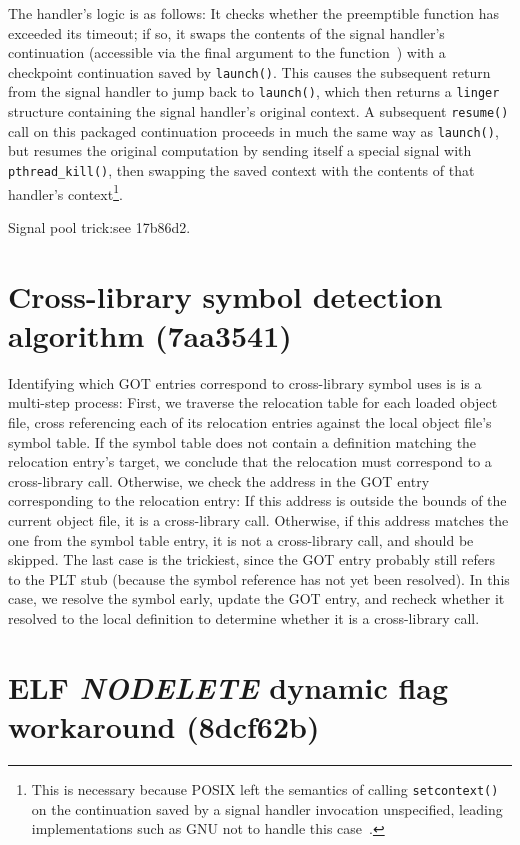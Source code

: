 \documentclass[12pt,letterpaper,openright]{report}
\begin{document}
The handler's logic is as follows:  It checks whether
the preemptible function has exceeded its timeout; if so, it swaps the contents
of the signal handler's continuation (accessible via the final argument to the
function~\cite{sigaction-manpage}) with a checkpoint continuation saved by
\texttt{launch()}.  This causes the subsequent return from the signal handler
to jump back to \texttt{launch()}, which then returns a \texttt{linger}
structure containing the signal handler's original context.  A subsequent
\texttt{resume()} call on this packaged continuation proceeds in much the same
way as \texttt{launch()}, but resumes the original computation by sending
itself a special signal with \texttt{pthread\_kill()}, then swapping the saved
context with the contents of that handler's context\footnote{This is necessary
because POSIX left the semantics of calling \texttt{setcontext()} on the
continuation saved by a signal handler invocation unspecified, leading
implementations such as GNU not to handle this
case~\cite{getcontext-manpage}.}.

Signal pool trick:\@ see 17b86d2.


\section{Cross-library symbol detection algorithm (7aa3541)}

Identifying which GOT entries correspond to cross-library symbol uses
is is a multi-step process:
First, we traverse the relocation table for each loaded object file, cross
referencing each of its relocation entries against the local object file's symbol
table.  If the symbol table does not contain a definition matching the relocation
entry's target, we conclude that the relocation must correspond to a cross-library
call.  Otherwise, we check the address in the GOT entry corresponding to the
relocation entry:  If this address is outside the bounds of the current object file,
it is a cross-library call.  Otherwise, if this address matches the one from the
symbol table entry, it is not a cross-library call, and should be skipped.  The last
case is the trickiest, since the GOT entry probably still refers to the PLT stub
(because the symbol reference has not yet been resolved).  In this case, we resolve
the symbol
early, update the GOT entry, and recheck whether it resolved to the local definition
to determine whether it is a cross-library call.


\section{ELF \textit{NODELETE} dynamic flag workaround (8dcf62b)}
\end{document}
